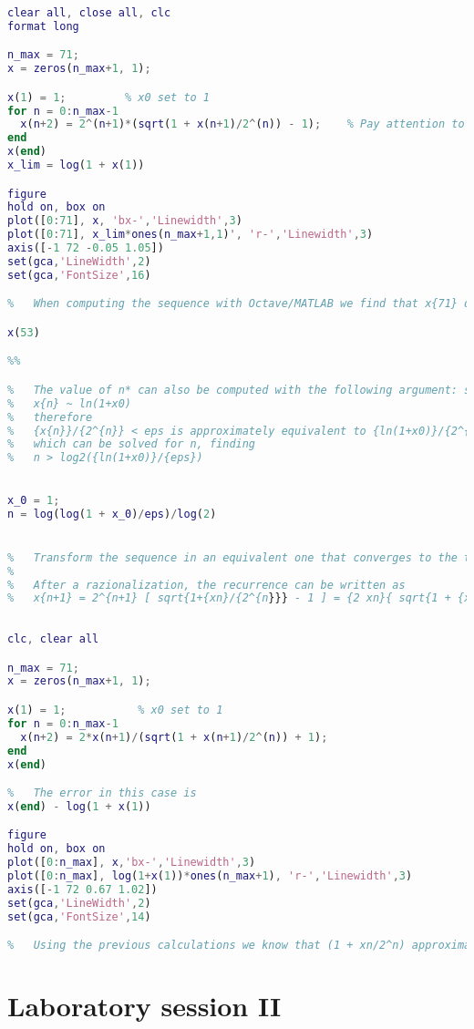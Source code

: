 \documentclass[12pt, a4paper]{report}
\newtheorem[style=M,bodystyle=\normalfont]{theorem}{Theorem}
\newtheorem[style=M,bodystyle=\normalfont]{corollary}{Corollary}
\newtheorem[style=M,bodystyle=\normalfont]{lemma}{Lemma}
\newtheorem[style=M,bodystyle=\normalfont]{definition}{Definition}
\begin{document}
    \begin{Answer}[ref=13]
        \begin{lstlisting}[language=Matlab]
%	Set x0 = 1, compute x1, x2, ... , x{71} and explain the obtained results.
	
clear all, close all, clc
format long

n_max = 71;
x = zeros(n_max+1, 1);

x(1) = 1;         % x0 set to 1
for n = 0:n_max-1
  x(n+2) = 2^(n+1)*(sqrt(1 + x(n+1)/2^(n)) - 1);    % Pay attention to the indexing!!!
end
x(end)            
x_lim = log(1 + x(1))

figure
hold on, box on
plot([0:71], x, 'bx-','Linewidth',3)
plot([0:71], x_lim*ones(n_max+1,1)', 'r-','Linewidth',3)
axis([-1 72 -0.05 1.05])
set(gca,'LineWidth',2)
set(gca,'FontSize',16)

%	When computing the sequence with Octave/MATLAB we find that x{71} differs a lot from ln(1+x0) = ln(2). The plots also shows that xn = 0, for all n >= n* = 52: this is due to numerical cancellation effects, because at n = n* it holds {x{n*}}/{2^{n*}} < eps, hence in finite precision arithmetic x{n*} = 0!

x(53)

%%

% 	The value of n* can also be computed with the following argument: since (hopefully) numerical cancellation will occur for large n
% 	x{n} ~ ln(1+x0)
% 	therefore
% 	{x{n}}/{2^{n}} < eps is approximately equivalent to {ln(1+x0)}/{2^{n}} < eps
% 	which can be solved for n, finding
% 	n > log2({ln(1+x0)}/{eps})

    
x_0 = 1;
n = log(log(1 + x_0)/eps)/log(2)


% 	Transform the sequence in an equivalent one that converges to the theoretical limit.
% 	
% 	After a razionalization, the recurrence can be written as
% 	x{n+1} = 2^{n+1} [ sqrt{1+{xn}/{2^{n}}} - 1 ] = {2 xn}{ sqrt{1 + {xn}/{2^{n}}} + 1}
	
	
clc, clear all

n_max = 71;
x = zeros(n_max+1, 1);

x(1) = 1;           % x0 set to 1
for n = 0:n_max-1
  x(n+2) = 2*x(n+1)/(sqrt(1 + x(n+1)/2^(n)) + 1);
end
x(end)

%   The error in this case is
x(end) - log(1 + x(1))

figure
hold on, box on
plot([0:n_max], x,'bx-','Linewidth',3)
plot([0:n_max], log(1+x(1))*ones(n_max+1), 'r-','Linewidth',3)
axis([-1 72 0.67 1.02])
set(gca,'LineWidth',2)
set(gca,'FontSize',14)

%   Using the previous calculations we know that (1 + xn/2^n) approximately 1 for n >= 52, so x(n+1) = 2*xn/(1 + 1) = xn
        \end{lstlisting}
    \end{Answer}



















    \newpage
    \chapter{Laboratory session II}
\end{document}
